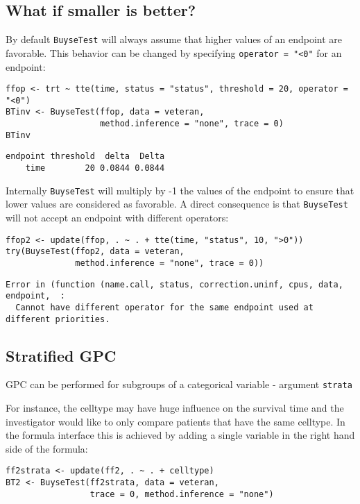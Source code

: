 \documentclass[12pt]{article}
\begin{document}
\clearpage

\subsection{What if smaller is better?}
\label{sec:org595fa4b}
By default \texttt{BuyseTest} will always assume that higher values of an
endpoint are favorable. This behavior can be changed by specifying \texttt{operator = "<0"}
for an endpoint:
\lstset{language=r,label= ,caption= ,captionpos=b,numbers=none}
\begin{lstlisting}
ffop <- trt ~ tte(time, status = "status", threshold = 20, operator = "<0")
BTinv <- BuyseTest(ffop, data = veteran, 
				   method.inference = "none", trace = 0)
BTinv
\end{lstlisting}

\begin{verbatim}
endpoint threshold  delta  Delta
    time        20 0.0844 0.0844
\end{verbatim}

Internally \texttt{BuyseTest} will multiply by -1 the values of the endpoint
to ensure that lower values are considered as favorable. A direct
consequence is that \texttt{BuyseTest} will not accept an endpoint with
different operators:
\lstset{language=r,label= ,caption= ,captionpos=b,numbers=none}
\begin{lstlisting}
ffop2 <- update(ffop, . ~ . + tte(time, "status", 10, ">0"))
try(BuyseTest(ffop2, data = veteran, 
			  method.inference = "none", trace = 0))
\end{lstlisting}

\begin{verbatim}
Error in (function (name.call, status, correction.uninf, cpus, data, endpoint,  : 
  Cannot have different operator for the same endpoint used at different priorities.
\end{verbatim}

\subsection{Stratified GPC}
\label{sec:orgeabb339}

GPC can be performed for subgroups of a categorical variable \hfill -
argument \texttt{strata}

\bigskip

 For instance, the celltype may have huge influence on the survival
time and the investigator would like to only compare patients that
have the same celltype. In the formula interface this is achieved by
adding a single variable in the right hand side of the formula:
\lstset{language=r,label= ,caption= ,captionpos=b,numbers=none}
\begin{lstlisting}
ff2strata <- update(ff2, . ~ . + celltype)
BT2 <- BuyseTest(ff2strata, data = veteran, 
				 trace = 0, method.inference = "none")
\end{lstlisting}
\end{document}

